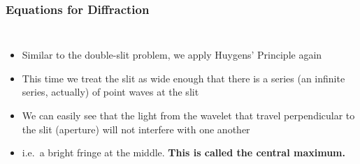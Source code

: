 \documentclass[compress,aspectratio=169]{beamer}
\begin{document}
\begin{frame}
  \frametitle{Equations for Diffraction}
  \begin{columns}

    \begin{itemize}
    \item Similar to the double-slit problem, we apply Huygens' Principle
      again
    \item This time we treat the slit as wide enough that there is a series
      (an infinite series, actually) of point waves at the slit
    \item We can easily see that the light from the wavelet that travel
      perpendicular to the slit (aperture) will not interfere with one another
    \item i.e.\ a bright fringe at the middle.
      \textbf{This is called the central maximum.}
    \end{itemize}
  \end{columns}
\end{frame}
\end{document}
